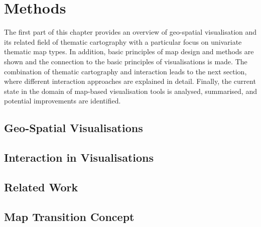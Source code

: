 \section{Methods}
\label{s:methods}
The first part of this chapter provides an overview of geo-spatial visualisation and its related field of thematic cartography with a particular focus on univariate thematic map types. In addition, basic principles of map design and methods are shown and the connection to the basic principles of visualisations is made. The combination of thematic cartography and interaction leads to the next section, where different interaction approaches are explained in detail. Finally, the current state in the domain of map-based visualisation tools is analysed, summarised, and potential improvements are identified.

\subsection{Geo-Spatial Visualisations}
\label{s:cartography}


\subsection{Interaction in Visualisations}
\label{s:interaction}


\subsection{Related Work}


\subsection{Map Transition Concept}
\label{s:theoretical-contrib}
